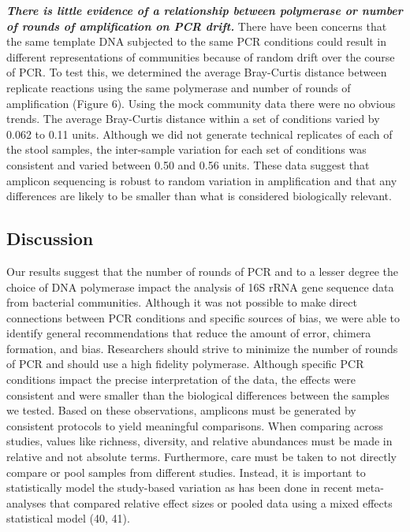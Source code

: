 \documentclass[11pt,]{article}
\begin{document}
\textbf{\emph{There is little evidence of a relationship between
polymerase or number of rounds of amplification on PCR drift.}} There
have been concerns that the same template DNA subjected to the same PCR
conditions could result in different representations of communities
because of random drift over the course of PCR. To test this, we
determined the average Bray-Curtis distance between replicate reactions
using the same polymerase and number of rounds of amplification (Figure
6). Using the mock community data there were no obvious trends. The
average Bray-Curtis distance within a set of conditions varied by 0.062
to 0.11 units. Although we did not generate technical replicates of each
of the stool samples, the inter-sample variation for each set of
conditions was consistent and varied between 0.50 and 0.56 units. These
data suggest that amplicon sequencing is robust to random variation in
amplification and that any differences are likely to be smaller than
what is considered biologically relevant.

\newpage

\hypertarget{discussion}{%
\subsection{Discussion}\label{discussion}}

Our results suggest that the number of rounds of PCR and to a lesser
degree the choice of DNA polymerase impact the analysis of 16S rRNA gene
sequence data from bacterial communities. Although it was not possible
to make direct connections between PCR conditions and specific sources
of bias, we were able to identify general recommendations that reduce
the amount of error, chimera formation, and bias. Researchers should
strive to minimize the number of rounds of PCR and should use a high
fidelity polymerase. Although specific PCR conditions impact the precise
interpretation of the data, the effects were consistent and were smaller
than the biological differences between the samples we tested. Based on
these observations, amplicons must be generated by consistent protocols
to yield meaningful comparisons. When comparing across studies, values
like richness, diversity, and relative abundances must be made in
relative and not absolute terms. Furthermore, care must be taken to not
directly compare or pool samples from different studies. Instead, it is
important to statistically model the study-based variation as has been
done in recent meta-analyses that compared relative effect sizes or
pooled data using a mixed effects statistical model (40, 41).
\end{document}
